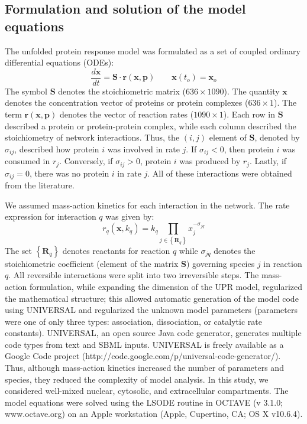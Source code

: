 \documentclass[fleqn,10pt]{wlscirep}
\begin{document}
\subsection*{Formulation and solution of the model equations}
The unfolded protein response model was formulated as a set of coupled ordinary differential equations (ODEs):
\begin{equation}\label{asseassertain_massbalance}
\frac{d\mathbf{x}}{dt}=\mathbf{S}\cdot\mathbf{r}\left(\mathbf{x},\mathbf{p}\right)\qquad\mathbf{x}\left(t_{o}\right)=\mathbf{x}_{o}
\end{equation}
The symbol $\mathbf{S}$ denotes the stoichiometric matrix ($636\times 1090$). The quantity $\mathbf{x}$ denotes the concentration vector of proteins or protein complexes ($636\times 1$).
The term $\mathbf{r}\left(\mathbf{x},\mathbf{p}\right)$ denotes the vector of reaction rates ($1090\times{1}$).
Each row in $\mathbf{S}$ described a protein or protein-protein complex,
while each column described the stoichiometry of network interactions.
Thus, the $(i,j)$ element of $\mathbf{S}$, denoted by $\sigma_{ij}$, described how protein $i$ was involved in rate $j$.
If $\sigma_{ij}<0$, then protein $i$ was consumed in $r_j$. Conversely, if $\sigma_{ij}>0$, protein $i$ was
produced by $r_j$. Lastly, if $\sigma_{ij}=0$, there was no protein $i$ in rate $j$. All of these interactions were obtained from the literature.

We assumed mass-action kinetics for each interaction in the network.
The rate expression for interaction $q$ was given by:
\begin{equation}\label{eq-mass-action}
r_{q}\left(\mathbf{x},k_{q}\right)=k_{q}\prod_{j\in\left\{\mathbf{R}_{q}\right\}}x_{j}^{-\sigma_{jq}}
\end{equation}
The set $\left\{\mathbf{R}_{q}\right\}$ denotes reactants for reaction $q$ while $\sigma_{jq}$ denotes the stoichiometric coefficient (element of the matrix $\mathbf{S}$) governing species $j$ in reaction $q$.
All reversible interactions were split into two irreversible steps. The mass-action formulation, while expanding the dimension of the UPR model,
regularized the mathematical structure; this allowed automatic generation of the model code using UNIVERSAL and regularized the unknown model parameters (parameters were one of only three types: association, dissociation, or catalytic rate constants).
UNIVERSAL, an open source Java code generator, generates multiple code types from text and SBML inputs.
UNIVERSAL is freely available as a Google Code project (http://code.google.com/p/universal-code-generator/).
Thus, although mass-action kinetics increased the number of parameters and species, they reduced the complexity of model analysis.
In this study, we considered well-mixed nuclear, cytosolic, and extracellular compartments.
The model equations were solved using the LSODE routine in OCTAVE (v 3.1.0; www.octave.org) on an Apple workstation (Apple, Cupertino, CA; OS X v10.6.4).
\end{document}
